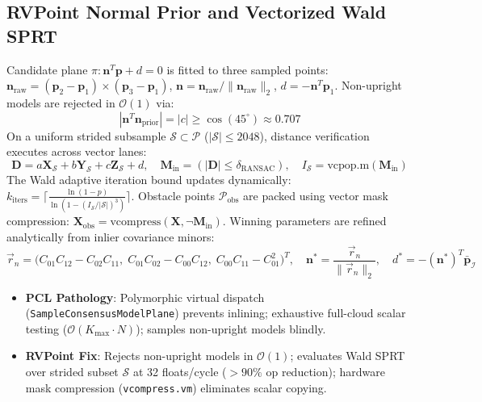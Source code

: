 \documentclass[11pt,a4paper]{article}
\begin{document}
\subsection{RVPoint Normal Prior and Vectorized Wald SPRT}
Candidate plane $\pi: \bm{n}^T \bm{p} + d = 0$ is fitted to three sampled points: $\bm{n}_{\text{raw}} = (\bm{p}_2 - \bm{p}_1) \times (\bm{p}_3 - \bm{p}_1)$, $\bm{n} = \bm{n}_{\text{raw}} / \|\bm{n}_{\text{raw}}\|_2$, $d = -\bm{n}^T \bm{p}_1$. Non-upright models are rejected in $\mathcal{O}(1)$ via:
\begin{equation}
\left| \bm{n}^T \bm{n}_{\text{prior}} \right| = |c| \ge \cos(45^\circ) \approx 0.707
\label{eq:prior_constraint}
\end{equation}
On a uniform strided subsample $\mathcal{S} \subset \mathcal{P}$ ($|\mathcal{S}| \le 2048$), distance verification executes across vector lanes:
\begin{equation}
\mathbf{D} = a \mathbf{X}_{\mathcal{S}} + b \mathbf{Y}_{\mathcal{S}} + c \mathbf{Z}_{\mathcal{S}} + d, \quad \mathbf{M}_{\text{in}} = (|\mathbf{D}| \le \delta_{\text{RANSAC}}), \quad I_{\mathcal{S}} = \text{vcpop.m}(\mathbf{M}_{\text{in}})
\end{equation}
The Wald adaptive iteration bound updates dynamically: $k_{\text{iters}} = \lceil \frac{\ln(1 - p)}{\ln(1 - (I_{\mathcal{S}}/|\mathcal{S}|)^3)} \rceil$. Obstacle points $\mathcal{P}_{\text{obs}}$ are packed using vector mask compression: $\mathbf{X}_{\text{obs}} = \text{vcompress}(\mathbf{X}, \neg \mathbf{M}_{\text{in}})$. Winning parameters are refined analytically from inlier covariance minors:
\begin{equation}
\vec{r}_n = \Big( C_{01}C_{12} - C_{02}C_{11}, \; C_{01}C_{02} - C_{00}C_{12}, \; C_{00}C_{11} - C_{01}^2 \Big)^T, \quad \bm{n}^* = \frac{\vec{r}_n}{\|\vec{r}_n\|_2}, \quad d^* = -(\bm{n}^*)^T \bar{\bm{p}}_{\mathcal{I}}
\label{eq:svd_refined_plane}
\end{equation}

\begin{tcolorbox}[fixcmp, title={Stage Comparison: Ground Plane Segmentation}]
\begin{itemize}[leftmargin=1.2em, itemsep=0.1em]
    \item \textbf{PCL Pathology}: Polymorphic virtual dispatch (\texttt{SampleConsensusModelPlane}) prevents inlining; exhaustive full-cloud scalar testing ($\mathcal{O}(K_{\max} \cdot N)$); samples non-upright models blindly.
    \item \textbf{RVPoint Fix}: Rejects non-upright models in $\mathcal{O}(1)$; evaluates Wald SPRT over strided subset $\mathcal{S}$ at 32 floats/cycle ($>90\%$ op reduction); hardware mask compression (\texttt{vcompress.vm}) eliminates scalar copying.
\end{itemize}
\end{tcolorbox}
\end{document}
